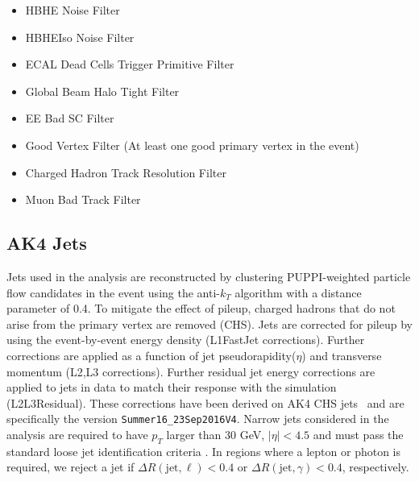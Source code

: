 \begin{itemize}
\item HBHE Noise Filter
\item HBHEIso Noise Filter
\item ECAL Dead Cells Trigger Primitive Filter
\item Global Beam Halo Tight Filter
\item EE Bad SC Filter
\item Good Vertex Filter (At least one good primary vertex in the event)
\item Charged Hadron Track Resolution Filter
\item Muon Bad Track Filter
\end{itemize}


\subsection{AK4 Jets}\label{jet}

Jets used in the analysis are reconstructed by clustering PUPPI-weighted particle flow candidates in the event using the anti-$k_T$ algorithm \cite{Cacciari:2008gp} with a distance parameter of 0.4. To mitigate the effect of pileup, charged hadrons that do not arise from the primary vertex are removed (CHS). 
Jets are corrected for pileup by using the event-by-event energy density (L1FastJet corrections). 
Further corrections are applied as a function of jet pseudorapidity($\eta$) and transverse momentum (L2,L3 corrections). 
Further residual jet energy corrections are applied to jets in data to match their response with the simulation (L2L3Residual).
These corrections have been derived on AK4 CHS jets~\cite{JEC_TWIKI} and are specifically the version \verb|Summer16_23Sep2016V4|.
Narrow jets considered in the analysis are required to have $p_T$ larger than 30 GeV, $|\eta| < 4.5$ and must pass the standard loose jet identification criteria \cite{TWIKI-JETID}.
In regions where a lepton or photon is required, we reject a jet if $\Delta R(\text{jet},\ell)<0.4$ or $\Delta R(\text{jet},\gamma)<0.4$, respectively.


